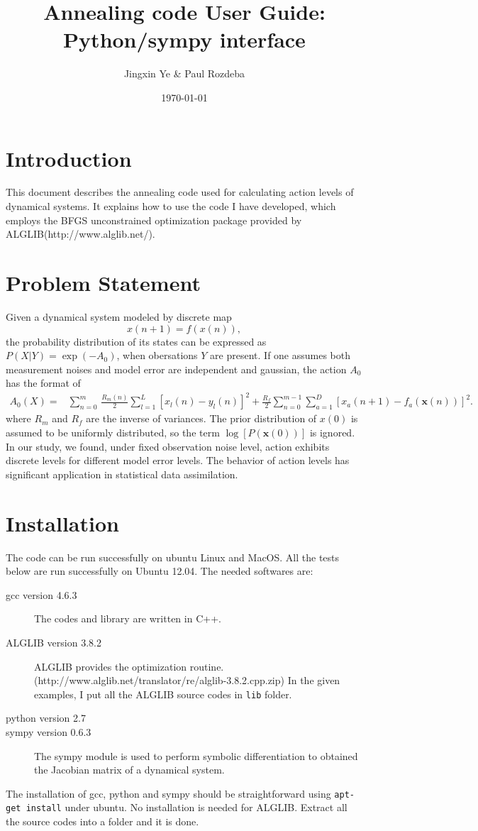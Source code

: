 \documentclass[11pt]{article}
\title{\textbf{Annealing code User Guide: Python/sympy interface}}
\author{Jingxin Ye \& Paul Rozdeba}
\date{\today}
\begin{document}
\maketitle
\section{Introduction}
This document describes the annealing code used for calculating action levels of dynamical systems. It explains how to use the code I have developed, which employs the BFGS unconstrained optimization package provided by ALGLIB(http://www.alglib.net/).


\section{Problem Statement}
Given a dynamical system modeled by discrete map
\[{x}(n+1)=f(x(n)),\]
the probability distribution of its states can be expressed as $P(X|Y)=\exp(-A_0)$, when obersations $Y$ are present.  If one assumes both measurement noises and model error are independent and gaussian, the action $A_0$ has the format of
\begin{align}
A_0(X) = &\sum_{n=0}^m\, \frac{R_m(n)}{2} \sum_{l=1}^L [x_l(n) - y_l(n)]^2 +  \frac{R_f}{2} \sum_{n=0}^{m-1} \sum_{a=1}^D[x_a(n+1) - f_a(\mathbf{x}(n))]^2 .
\label{eq:actionform}
\end{align}
where $R_m$ and $R_f$ are the inverse of variances. The prior distribution of $x(0)$ is assumed to be uniformly distributed, so the term $\log[P(\mathbf{x}(0))]$ is ignored. In our study, we found, under fixed observation noise level, action exhibits discrete levels for different model error levels. The behavior of action levels has significant application in statistical data assimilation.


\section{Installation} 
The code can be run successfully on ubuntu Linux and MacOS. All the tests below are run successfully on Ubuntu 12.04. The needed softwares are:
\begin{description}
\item[gcc version 4.6.3] The codes and library are written in C++. 
\item[ALGLIB version 3.8.2] ALGLIB provides the optimization routine.\\ (http://www.alglib.net/translator/re/alglib-3.8.2.cpp.zip) In the given examples, I put all the ALGLIB source codes in \texttt{lib} folder.
\item[python version 2.7]
\item[sympy version 0.6.3] The sympy module is used to perform symbolic differentiation to obtained the Jacobian matrix of a dynamical system.
\end{description}
The installation of gcc, python and sympy should be straightforward using \texttt{apt-get install} under ubuntu. No installation is needed for ALGLIB. Extract all the source codes into a folder and it is done.
\end{document}
